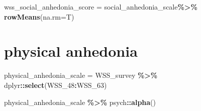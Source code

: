 \documentclass[
]{article}
\newenvironment{Shaded}{\begin{snugshade}}{\end{snugshade}}
\newcommand{\AttributeTok}[1]{\textcolor[rgb]{0.13,0.29,0.53}{#1}}
\newcommand{\FunctionTok}[1]{\textcolor[rgb]{0.13,0.29,0.53}{\textbf{#1}}}
\newcommand{\NormalTok}[1]{#1}
\newcommand{\OtherTok}[1]{\textcolor[rgb]{0.56,0.35,0.01}{#1}}
\newcommand{\SpecialCharTok}[1]{\textcolor[rgb]{0.81,0.36,0.00}{\textbf{#1}}}
\begin{document}
\begin{Shaded}
\begin{Highlighting}[]
\NormalTok{wss\_social\_anhedonia\_score }\OtherTok{=}\NormalTok{ social\_anhedonia\_scale}\SpecialCharTok{\%\textgreater{}\%} \FunctionTok{rowMeans}\NormalTok{(}\AttributeTok{na.rm=}\NormalTok{T)}
\end{Highlighting}
\end{Shaded}

\section{physical anhedonia}\label{physical-anhedonia}

\begin{Shaded}
\begin{Highlighting}[]
\NormalTok{physical\_anhedonia\_scale }\OtherTok{=}\NormalTok{ WSS\_survey }\SpecialCharTok{\%\textgreater{}\%}\NormalTok{ dplyr}\SpecialCharTok{::}\FunctionTok{select}\NormalTok{(WSS\_48}\SpecialCharTok{:}\NormalTok{WSS\_63)}

\NormalTok{physical\_anhedonia\_scale }\SpecialCharTok{\%\textgreater{}\%}\NormalTok{ psych}\SpecialCharTok{::}\FunctionTok{alpha}\NormalTok{()}
\end{Highlighting}
\end{Shaded}
\end{document}
